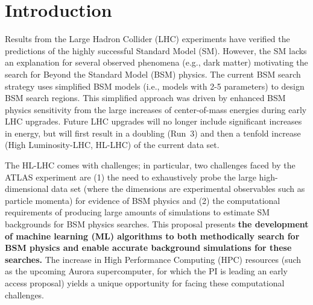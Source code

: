 \documentclass[letter, USenglish, 11pt, subfigure]{article}
\date{}
\begin{document}


\clearpage
\tableofcontents
\clearpage
{} 

\section{Introduction}

Results from the Large Hadron Collider (LHC) experiments have verified the predictions of the highly successful Standard Model (SM). However, the SM  lacks an explanation for several observed phenomena (e.g., dark matter) motivating the search for Beyond the Standard Model (BSM) physics. The current BSM search strategy uses simplified BSM models (i.e., models with 2-5 parameters) to design BSM search regions. This simplified approach was driven by enhanced BSM physics sensitivity from the large increases of center-of-mass energies during early LHC upgrades. Future LHC upgrades will no longer include significant increases in energy, but will first result in a doubling (Run~3) and then a tenfold increase (High Luminosity-LHC, HL-LHC) of the current data set.

The HL-LHC comes with challenges; in particular, two challenges faced by the ATLAS experiment are (1) the need to exhaustively probe the large high-dimensional data set (where the dimensions are experimental observables such as particle momenta) for evidence of BSM physics and (2) the computational requirements of producing large amounts of simulations to estimate SM backgrounds for BSM physics searches. This proposal presents {\bf the development of machine learning (ML) algorithms to both methodically search for BSM physics and enable accurate background simulations for these searches.} The increase in High Performance Computing (HPC) resources (such as the upcoming Aurora supercomputer, for which the PI is leading an early access proposal) yields a unique opportunity for facing these computational challenges.
\end{document}
